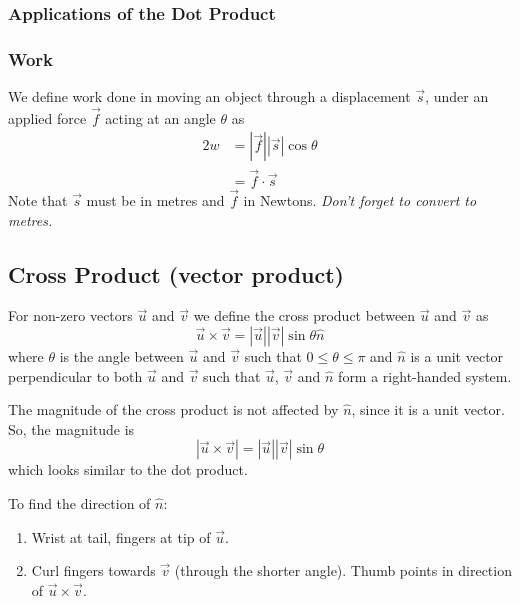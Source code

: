 \documentclass{report}
\theoremstyle{definition}
\numberwithin{equation}{section}
\begin{document}
\subsubsection{Applications of the Dot Product}
\subsubsection*{Work}
We define work done in moving an object through a displacement $\vec s$, under an applied force $\vec f$ acting at an angle $\theta$ as
\begin{alignat}{2}
	w &= |\vec f||\vec s|\cos \theta \\
		&= \vec f \cdot \vec s
\end{alignat}
Note that $\vec s$ must be in metres and $\vec f$ in Newtons. \emph{Don't forget to convert to metres.}

\subsection{Cross Product (vector product)}
For non-zero vectors $\vec u$ and $\vec v$ we define the cross product between $\vec u$ and $\vec v$ as
\begin{equation}
	\vec u \times \vec v = |\vec u||\vec v|\sin \theta \hat n
\end{equation}
where $\theta$ is the angle between $\vec u$ and $\vec v$ such that $0 \le \theta \le \pi$ and $\hat n$ is a unit vector perpendicular to both $\vec u$ and $\vec v$ such that $\vec u$, $\vec v$ and $\hat n$ form a right-handed system.

The magnitude of the cross product is not affected by $\hat n$, since it is a unit vector. So, the magnitude is
\begin{equation}
	|\vec u \times \vec v| = |\vec u||\vec v|\sin \theta
\end{equation}
which looks similar to the dot product.

\bigskip \noindent
To find the direction of $\hat n$:
\begin{enumerate}
	\item Wrist at tail, fingers at tip of $\vec u$.
	\item Curl fingers towards $\vec v$ (through the shorter angle). Thumb points in direction of $\vec u \times \vec v$.
\end{enumerate}
\end{document}
